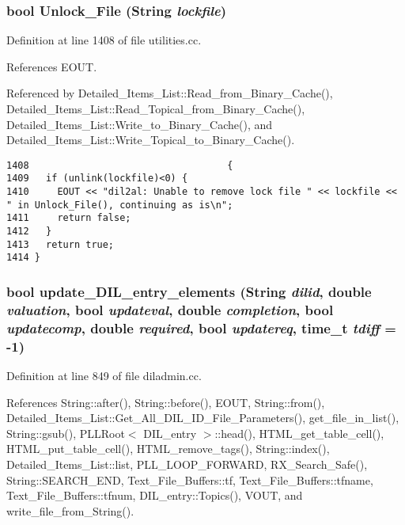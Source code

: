 \subsubsection{\setlength{\rightskip}{0pt plus 5cm}bool Unlock\_\-File ({\bf String} {\em lockfile})}\label{dil2al_8hh_a241}




Definition at line 1408 of file utilities.cc.

References EOUT.

Referenced by Detailed\_\-Items\_\-List::Read\_\-from\_\-Binary\_\-Cache(), Detailed\_\-Items\_\-List::Read\_\-Topical\_\-from\_\-Binary\_\-Cache(), Detailed\_\-Items\_\-List::Write\_\-to\_\-Binary\_\-Cache(), and Detailed\_\-Items\_\-List::Write\_\-Topical\_\-to\_\-Binary\_\-Cache().



\footnotesize\begin{verbatim}1408                                   {
1409   if (unlink(lockfile)<0) {
1410     EOUT << "dil2al: Unable to remove lock file " << lockfile << " in Unlock_File(), continuing as is\n";
1411     return false;
1412   }
1413   return true;
1414 }
\end{verbatim}\normalsize 
{}
\subsubsection{\setlength{\rightskip}{0pt plus 5cm}bool update\_\-DIL\_\-entry\_\-elements ({\bf String} {\em dilid}, double {\em valuation}, bool {\em updateval}, double {\em completion}, bool {\em updatecomp}, double {\em required}, bool {\em updatereq}, time\_\-t {\em tdiff} = -1)}\label{dil2al_8hh_a304}




Definition at line 849 of file diladmin.cc.

References String::after(), String::before(), EOUT, String::from(), Detailed\_\-Items\_\-List::Get\_\-All\_\-DIL\_\-ID\_\-File\_\-Parameters(), get\_\-file\_\-in\_\-list(), String::gsub(), PLLRoot$<$ DIL\_\-entry $>$::head(), HTML\_\-get\_\-table\_\-cell(), HTML\_\-put\_\-table\_\-cell(), HTML\_\-remove\_\-tags(), String::index(), Detailed\_\-Items\_\-List::list, PLL\_\-LOOP\_\-FORWARD, RX\_\-Search\_\-Safe(), String::SEARCH\_\-END, Text\_\-File\_\-Buffers::tf, Text\_\-File\_\-Buffers::tfname, Text\_\-File\_\-Buffers::tfnum, DIL\_\-entry::Topics(), VOUT, and write\_\-file\_\-from\_\-String().

